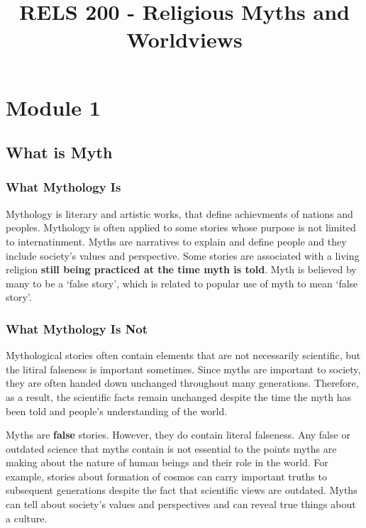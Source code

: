 \documentclass{article}
\title{RELS 200 - Religious Myths and Worldviews}
\begin{document}
\maketitle
\tableofcontents
\newpage

\section{Module 1}

\subsection{What is Myth}

\subsubsection{What Mythology Is}

Mythology is literary and artistic works, that define achievments of nations and peoples. Mythology is often applied to some stories whose purpose is not limited to internatinment. Myths are narratives to explain and define people and they include society's values and perspective. Some stories are associated with a living religion \textbf{still being practiced at the time myth is told}. Myth is believed by many to be a `false story', which is related to popular use of myth to mean `false story'.

\subsubsection{What Mythology Is Not}

Mythological stories often contain elements that are not necessarily scientific, but the litiral falseness is important sometimes. Since myths are important to society, they are often handed down unchanged throughout many generations. Therefore, as a result, the scientific facts remain unchanged despite the time the myth has been told and people's understanding of the world.

Myths are \textbf{false} stories. However, they do contain literal falseness. Any false or outdated science that myths contain is not essential to the points myths are making about the nature of human beings and their role in the world. For example, stories about formation of cosmos can carry important truths to subsequent generations despite the fact that scientific views are outdated. Myths can tell about society's values and perspectives and can reveal true things about a culture.
\end{document}
